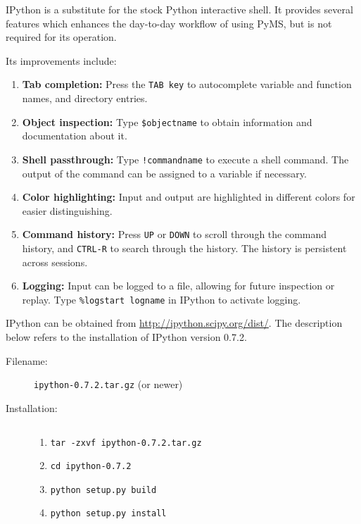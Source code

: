 IPython is a substitute for the stock Python interactive shell. It
provides several features which enhances the day-to-day workflow of
using PyMS, but is not required for its operation.

Its improvements include:
\begin{enumerate}
    \item {\bf Tab completion:} Press the {\tt TAB key} to autocomplete
          variable and function names, and directory entries.
    \item {\bf Object inspection:} Type {\tt \$objectname} to obtain
          information and documentation about it.
    \item {\bf Shell passthrough:} Type {\tt !commandname} to execute a
          shell command. The output of the command can be assigned to a
          variable if necessary.
    \item {\bf Color highlighting:} Input and output are highlighted in
          different colors for easier distinguishing.
    \item {\bf Command history:} Press {\tt UP} or {\tt DOWN} to scroll through the
          command history, and {\tt CTRL-R} to search through the history. The
          history is persistent across sessions.
    \item {\bf Logging:} Input can be logged to a file, allowing for
          future inspection or replay. Type {\tt \%logstart logname}
          in IPython to activate logging.
\end{enumerate}

IPython can be obtained from \url{http://ipython.scipy.org/dist/}. The
description below refers to the installation of IPython version 0.7.2.

\begin{description}
\item [Filename:] {\tt ipython-0.7.2.tar.gz} (or newer)
\item [Installation:] $ $
  \begin{enumerate}
  \item {\tt tar -zxvf ipython-0.7.2.tar.gz}
  \item {\tt cd ipython-0.7.2}
  \item {\tt python setup.py build}
  \item {\tt python setup.py install}
  \end{enumerate}
\end{description}
